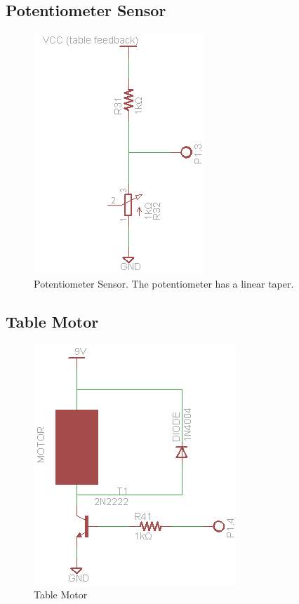 \documentclass[a4paper, 11pt]{article}
\begin{document}
	\subsection{Potentiometer Sensor}
	\begin{figure}[!ht]
		\centering
		\includegraphics{potentiometer-sensor}
		\caption{Potentiometer Sensor.  The potentiometer has a linear taper.}
	\end{figure}
\newpage
	\subsection{Table Motor}
	\begin{figure}[!ht]
		\centering
		\includegraphics{table-motor}
		\caption{Table Motor}
	\end{figure}
\end{document}

